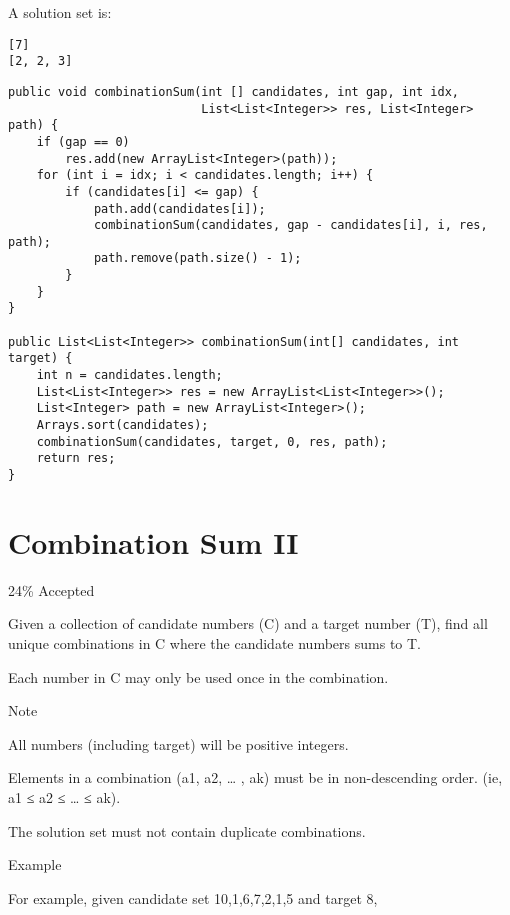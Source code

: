 \documentclass[9pt, b5paaper]{book}
\begin{document}
A solution set is: 
\begin{verbatim}
[7] 
[2, 2, 3]
\end{verbatim}
\begin{verbatim}
public void combinationSum(int [] candidates, int gap, int idx, 
                           List<List<Integer>> res, List<Integer> path) {
    if (gap == 0) 
        res.add(new ArrayList<Integer>(path));
    for (int i = idx; i < candidates.length; i++) {
        if (candidates[i] <= gap) {
            path.add(candidates[i]);
            combinationSum(candidates, gap - candidates[i], i, res, path);
            path.remove(path.size() - 1);
        }
    }
}
        
public List<List<Integer>> combinationSum(int[] candidates, int target) {
    int n = candidates.length;
    List<List<Integer>> res = new ArrayList<List<Integer>>();
    List<Integer> path = new ArrayList<Integer>();
    Arrays.sort(candidates);
    combinationSum(candidates, target, 0, res, path);
    return res;
}
\end{verbatim}
\section{Combination Sum II}
\label{sec-1-23}

24\% Accepted

Given a collection of candidate numbers (C) and a target number (T), find all unique combinations in C where the candidate numbers sums to T.

Each number in C may only be used once in the combination.

Note

All numbers (including target) will be positive integers.

Elements in a combination (a1, a2, … , ak) must be in non-descending order. (ie, a1 ≤ a2 ≤ … ≤ ak).

The solution set must not contain duplicate combinations.

Example

For example, given candidate set 10,1,6,7,2,1,5 and target 8,
\end{document}
